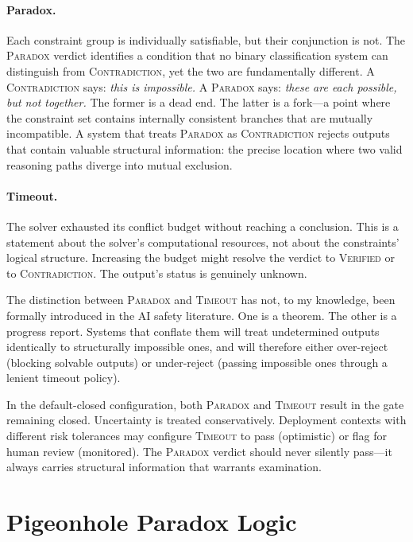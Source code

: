 \documentclass[11pt,a4paper]{article}
\begin{document}
\paragraph{Paradox.}
Each constraint group is individually satisfiable, but their conjunction is not.
The \textsc{Paradox} verdict identifies a condition that no binary classification system can distinguish from \textsc{Contradiction}, yet the two are fundamentally different.
A \textsc{Contradiction} says: \emph{this is impossible.}
A \textsc{Paradox} says: \emph{these are each possible, but not together.}
The former is a dead end.
The latter is a fork---a point where the constraint set contains internally consistent branches that are mutually incompatible.
A system that treats \textsc{Paradox} as \textsc{Contradiction} rejects outputs that contain valuable structural information: the precise location where two valid reasoning paths diverge into mutual exclusion.

\paragraph{Timeout.}
The solver exhausted its conflict budget without reaching a conclusion.
This is a statement about the solver's computational resources, not about the constraints' logical structure.
Increasing the budget might resolve the verdict to \textsc{Verified} or to \textsc{Contradiction}.
The output's status is genuinely unknown.

The distinction between \textsc{Paradox} and \textsc{Timeout} has not, to my knowledge, been formally introduced in the AI safety literature.
One is a theorem.
The other is a progress report.
Systems that conflate them will treat undetermined outputs identically to structurally impossible ones, and will therefore either over-reject (blocking solvable outputs) or under-reject (passing impossible ones through a lenient timeout policy).

In the default-closed configuration, both \textsc{Paradox} and \textsc{Timeout} result in the gate remaining closed.
Uncertainty is treated conservatively.
Deployment contexts with different risk tolerances may configure \textsc{Timeout} to pass (optimistic) or flag for human review (monitored).
The \textsc{Paradox} verdict should never silently pass---it always carries structural information that warrants examination.

\section{Pigeonhole Paradox Logic}
\end{document}
